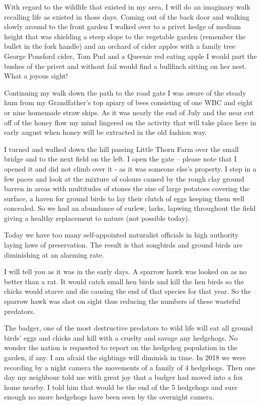 With regard to the wildlife that existed in my area, I will do an imaginary walk
recalling life as existed in those days.  Coming out of the back door and
walking slowly around to the front garden I walked over to a privet hedge of
medium height that was shielding a steep slope to the vegetable garden
(remember the bullet in the fork handle) and an orchard of cider apples with a
family tree George Ponsford cider, Tom Pud and a Queenie red eating apple I
would part the bushes of the privet and without fail would find a bullfinch
sitting on her nest.  What a joyous sight!

Continuing my walk down the path to the road gate I was aware of the steady hum
from my Grandfather's top apiary of bees consisting of one WBC and eight or
nine homemade straw skips.  As it was nearly the end of July and the near cut
off of the honey flow my mind lingered on the activity that will take place
here in early august when honey will be extracted in the old fashion way.

I turned and walked down the hill passing Little Thorn Farm over the small
bridge and to the next field on the left.  I open the gate – please note that I
opened it and did not climb over it - as it was someone else's property.  I
step in a few paces and look at the mixture of colours caused by the rough clay
ground barren in areas with multitudes of stones the size of large potatoes
covering the surface, a haven for ground birds to lay their clutch of eggs
keeping them well concealed.  So we had an abundance of curlew, larks, lapwing
throughout the field giving a healthy replacement to nature (not possible
today).

Today we have too many self-appointed naturalist officials in high authority
laying laws of preservation.  The result is that songbirds and ground birds are
diminishing at an alarming rate.

I will tell you as it was in the early days.  A sparrow hawk was looked on as no
better than a rat.  It would catch small hen birds and kill the hen birds so
the chicks would starve and die causing the end of that species for that year.
So the sparrow hawk was shot on sight thus reducing the numbers of these
wasteful predators.



The badger, one of the most destructive predators to wild life will eat all
ground birds' eggs and chicks and kill with a cruelty and savage any hedgehogs.
No wonder the nation is requested to report on the hedgehog population in the
garden, if any.  I am afraid the sightings will diminish in time.  In 2018 we
were recording by a night camera the movements of a family of 4 hedgehogs. Then
one day my neighbour told me with great joy that a badger had moved into a fox
home nearby. I told him that would be the end of the 5 hedgehogs and sure
enough no more hedgehogs have been seen by the overnight camera.

